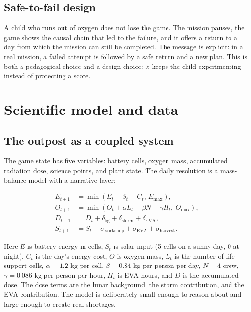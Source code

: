 \documentclass[11pt,a4paper]{article}
\begin{document}
\subsection{Safe-to-fail design}

A child who runs out of oxygen does not lose the game. The mission pauses, the game shows the causal chain that led to the failure, and it offers a return to a day from which the mission can still be completed. The message is explicit: in a real mission, a failed attempt is followed by a safe return and a new plan. This is both a pedagogical choice and a design choice: it keeps the child experimenting instead of protecting a score.

\section{Scientific model and data}

\subsection{The outpost as a coupled system}

The game state has five variables: battery cells, oxygen mass, accumulated radiation dose, science points, and plant state. The daily resolution is a mass-balance model with a narrative layer:

\begin{align}
E_{t+1} &= \min(E_t + S_t - C_t,\ E_{\max}),\\
O_{t+1} &= \min(O_t + \alpha L_t - \beta N - \gamma H_t,\ O_{\max}),\\
D_{t+1} &= D_t + \delta_{\mathrm{bg}} + \delta_{\mathrm{storm}} + \delta_{\mathrm{EVA}},\\
S_{t+1} &= S_t + \sigma_{\mathrm{workshop}} + \sigma_{\mathrm{EVA}} + \sigma_{\mathrm{harvest}}.
\end{align}

Here $E$ is battery energy in cells, $S_t$ is solar input (5 cells on a sunny day, 0 at night), $C_t$ is the day's energy cost, $O$ is oxygen mass, $L_t$ is the number of life-support cells, $\alpha=1.2$ kg per cell, $\beta=0.84$ kg per person per day, $N=4$ crew, $\gamma=0.086$ kg per person per hour, $H_t$ is EVA hours, and $D$ is the accumulated dose. The dose terms are the lunar background, the storm contribution, and the EVA contribution. The model is deliberately small enough to reason about and large enough to create real shortages.
\end{document}
